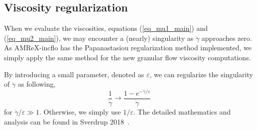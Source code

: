 \subsection{Viscosity regularization}
When we evaluate the viscosities, equations (\ref{eq_mu1_main}) and (\ref{eq_mu2_main}), we may encounter a (nearly) singularity as $\dot{\gamma}$ approaches zero.
As AMReX-incflo has the Papanastasiou regularization method implemented, we simply apply the same method for the new granular flow viscosity computations.
\par
By introducing a small parameter, denoted as $\varepsilon$, we can regularize the singularity of $\dot{\gamma}$ as following,
\[
  \frac{1}{\dot{\gamma}} \rightarrow \frac{1-e^{-\dot{\gamma} / \varepsilon}}{\dot{\gamma}}  
\]
for $\dot{\gamma}/\varepsilon \gg 1$. Otherwise, we simply use $1/\varepsilon$. 
The detailed mathematics and analysis can be found in Sverdrup 2018~\cite{sverdrup_highly_2018}.

